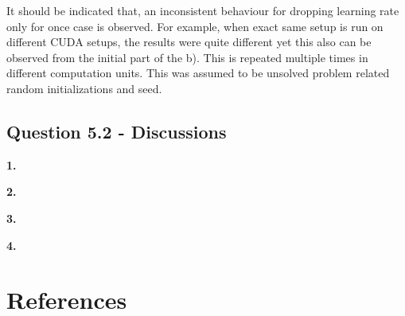 \documentclass{assignment}
\begin{document}
It should be indicated that, an inconsistent behaviour for dropping learning rate only for once case is observed. For example, when exact same setup is run on different CUDA setups, the results were quite different yet this also can be observed from the initial part of the b). This is repeated multiple times in different computation units. This was assumed to be unsolved problem related random initializations and seed.

\subsection{Question 5.2 - Discussions}

\textbf{1.}

\textbf{2.}

\textbf{3.}

\textbf{4.}


\newpage
\section{References}
\nocite{*} 
   
     
\end{document}
